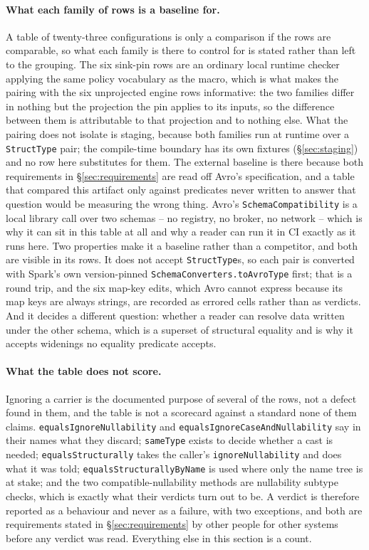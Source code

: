 \paragraph{What each family of rows is a baseline for.}
\label{sec:baselines}
A table of twenty-three configurations is only a comparison if the rows are comparable, so what each family is there to control for is stated rather than left to the grouping. The six sink-pin rows are an ordinary local runtime checker applying the same policy vocabulary as the macro, which is what makes the pairing with the six unprojected engine rows informative: the two families differ in nothing but the projection the pin applies to its inputs, so the difference between them is attributable to that projection and to nothing else. What the pairing does not isolate is staging, because both families run at runtime over a \texttt{StructType} pair; the compile-time boundary has its own fixtures (\S\ref{sec:staging}) and no row here substitutes for them. The external baseline is there because both requirements in \S\ref{sec:requirements} are read off Avro's specification, and a table that compared this artifact only against predicates never written to answer that question would be measuring the wrong thing. Avro's \texttt{SchemaCompatibility} is a local library call over two schemas -- no registry, no broker, no network -- which is why it can sit in this table at all and why a reader can run it in CI exactly as it runs here. Two properties make it a baseline rather than a competitor, and both are visible in its rows. It does not accept \texttt{StructType}s, so each pair is converted with Spark's own version-pinned \texttt{SchemaConverters.toAvroType} first; that is a round trip, and the six map-key edits, which Avro cannot express because its map keys are always strings, are recorded as errored cells rather than as verdicts. And it decides a different question: whether a reader can resolve data written under the other schema, which is a superset of structural equality and is why it accepts widenings no equality predicate accepts.

\paragraph{What the table does not score.} Ignoring a carrier is the documented purpose of several of the rows, not a defect found in them, and the table is not a scorecard against a standard none of them claims. \texttt{equalsIgnoreNullability} and \texttt{equalsIgnoreCaseAndNullability} say in their names what they discard; \texttt{sameType} exists to decide whether a cast is needed; \texttt{equalsStructurally} takes the caller's \texttt{ignoreNullability} and does what it was told; \texttt{equalsStructurallyByName} is used where only the name tree is at stake; and the two compatible-nullability methods are nullability subtype checks, which is exactly what their verdicts turn out to be. A verdict is therefore reported as a behaviour and never as a failure, with two exceptions, and both are requirements stated in \S\ref{sec:requirements} by other people for other systems before any verdict was read. Everything else in this section is a count.

